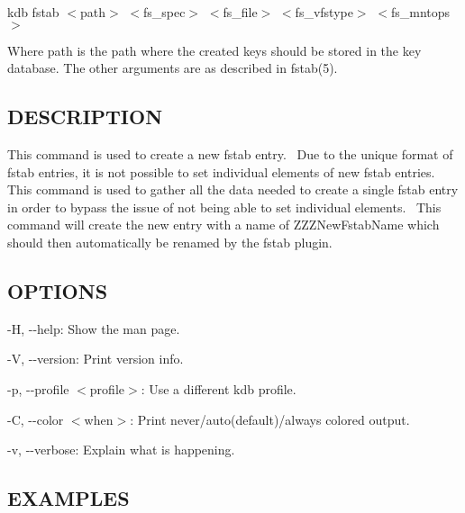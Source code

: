 {\ttfamily kdb fstab $<$path$>$ $<$fs\+\_\+spec$>$ $<$fs\+\_\+file$>$ $<$fs\+\_\+vfstype$>$ $<$fs\+\_\+mntops$>$}

Where {\ttfamily path} is the path where the created keys should be stored in the key database. The other arguments are as described in fstab(5).

\subsection*{D\+E\+S\+C\+R\+I\+P\+T\+I\+ON}

This command is used to create a new {\ttfamily fstab} entry.~\newline
 Due to the unique format of {\ttfamily fstab} entries, it is not possible to set individual elements of new {\ttfamily fstab} entries.~\newline
 This command is used to gather all the data needed to create a single {\ttfamily fstab} entry in order to bypass the issue of not being able to set individual elements.~\newline
 This command will create the new entry with a name of {\ttfamily Z\+Z\+Z\+New\+Fstab\+Name} which should then automatically be renamed by the {\ttfamily fstab} plugin.~\newline


\subsection*{O\+P\+T\+I\+O\+NS}


\begin{DoxyItemize}
\item {\ttfamily -\/H}, {\ttfamily -\/-\/help}\+: Show the man page.
\item {\ttfamily -\/V}, {\ttfamily -\/-\/version}\+: Print version info.
\item {\ttfamily -\/p}, {\ttfamily -\/-\/profile $<$profile$>$}\+: Use a different kdb profile.
\item {\ttfamily -\/C}, {\ttfamily -\/-\/color $<$when$>$}\+: Print never/auto(default)/always colored output.
\item {\ttfamily -\/v}, {\ttfamily -\/-\/verbose}\+: Explain what is happening.
\end{DoxyItemize}

\subsection*{E\+X\+A\+M\+P\+L\+ES}

